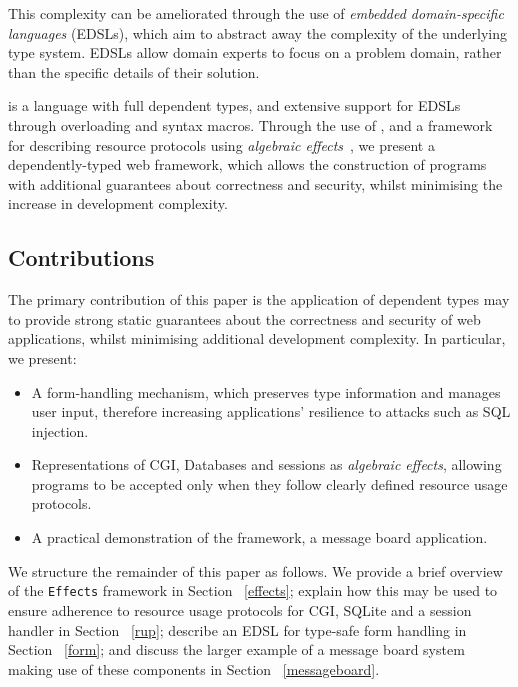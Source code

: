 \documentclass[preprint]{sigplanconf}
\begin{document}
This complexity can be ameliorated through the use of \textit{embedded
domain-specific languages} (EDSLs), which aim to abstract away the
complexity of the underlying type system. EDSLs allow domain experts to
focus on a problem domain, rather than the specific details of their
solution.

\idris{} \cite{brady2011idris} is a language with full dependent types, and
extensive support for EDSLs through overloading and syntax macros. Through the
use of \idris{}, and a framework for describing resource protocols using
\emph{algebraic effects}~\cite{brady:effects}, we
present a dependently-typed web framework, which allows the construction of
programs with additional guarantees about correctness and security, whilst
minimising the increase in development complexity. 

\subsection{Contributions}
The primary contribution of this paper is the application of 
dependent types may to provide strong static guarantees
about the correctness and security of web applications, whilst minimising
additional development complexity. In particular, we present:

\begin{itemize}
\item A form-handling mechanism, which preserves type information and
manages user input, therefore
increasing applications' resilience to attacks such as SQL injection.

\item Representations of CGI, Databases and sessions as
\textit{algebraic effects}, allowing programs to be accepted only when they
follow clearly defined resource usage protocols.

\item A practical demonstration of the framework, a message board application.

\end{itemize}

We structure the remainder of this paper as follows. We provide a brief overview of the \texttt{Effects} framework in Section ~\ref{effects}; explain how this may be used to ensure adherence to resource usage protocols for CGI, SQLite and a session handler in Section ~\ref{rup}; describe an EDSL for type-safe form handling in Section ~\ref{form}; and discuss the larger example of a message board system making use of these components in Section ~\ref{messageboard}.
\end{document}

